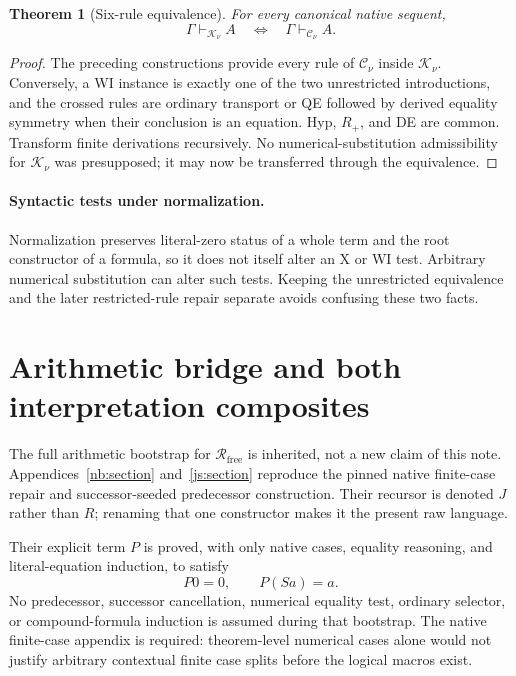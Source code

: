 \documentclass[11pt]{article}
\newtheorem{theorem}{Theorem}[section]
\theoremstyle{definition}
\newcommand{\Rfree}{\mathcal R_{\mathrm{free}}}
\newcommand{\Cnorm}{\mathcal C_\nu}
\newcommand{\Knorm}{\mathcal K_\nu}
\begin{document}
\begin{theorem}[Six-rule equivalence]\label{cr:six}
For every canonical native sequent,
\[
\Gamma\vdash_{\Knorm}A
\quad\Longleftrightarrow\quad
\Gamma\vdash_{\Cnorm}A.
\]
\end{theorem}
\begin{proof}
The preceding constructions provide every rule of \(\Cnorm\) inside \(\Knorm\). Conversely, a WI instance is exactly one of the two unrestricted introductions, and the crossed rules are ordinary transport or QE followed by derived equality symmetry when their conclusion is an equation. Hyp, \(R_+\), and DE are common. Transform finite derivations recursively. No numerical-substitution admissibility for \(\Knorm\) was presupposed; it may now be transferred through the equivalence.
\end{proof}

\paragraph{Syntactic tests under normalization.}
Normalization preserves literal-zero status of a whole term and the root constructor of a formula, so it does not itself alter an X or WI test. Arbitrary numerical substitution can alter such tests. Keeping the unrestricted equivalence and the later restricted-rule repair separate avoids confusing these two facts.

\section{Arithmetic bridge and both interpretation composites}

The full arithmetic bootstrap for \(\Rfree\) is inherited, not a new claim of this note. Appendices~\ref{nb:section} and~\ref{js:section} reproduce the pinned native finite-case repair and successor-seeded predecessor construction. Their recursor is denoted \(J\) rather than \(R\); renaming that one constructor makes it the present raw language.

Their explicit term \(P\) is proved, with only native cases, equality reasoning, and literal-equation induction, to satisfy
\[
P0=0,\qquad P(Sa)=a.
\]
No predecessor, successor cancellation, numerical equality test, ordinary selector, or compound-formula induction is assumed during that bootstrap. The native finite-case appendix is required: theorem-level numerical cases alone would not justify arbitrary contextual finite case splits before the logical macros exist.
\end{document}
